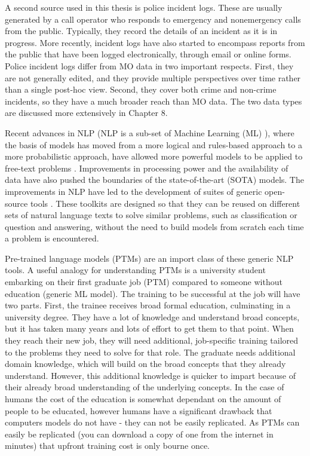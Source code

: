 A second source used in this thesis is police incident logs. These are usually generated by a call operator who responds to emergency and nonemergency calls from the public. Typically, they record the details of an incident as it is in progress. More recently, incident logs have also started to encompass reports from the public that have been logged electronically, through email or online forms. Police incident logs differ from MO data in two important respects. First, they are not generally edited, and they provide multiple perspectives over time rather than a single post-hoc view. Second, they cover both crime and non-crime incidents, so they have a much broader reach than MO data. The two data types are discussed more extensively in Chapter 8.

Recent advances in NLP (NLP is a sub-set of Machine Learning (ML) ), where the basis of models has moved from a more logical and rules-based approach to a more probabilistic approach, have allowed more powerful models to be applied to free-text problems \parencite{kumar2011natural}. Improvements in processing power and the availability of data have also pushed the boundaries of the state-of-the-art (SOTA) models. The improvements in NLP have led to the development of suites of generic open-source tools \parencite{manning2014stanford, benoit2018quanteda, loper2002nltk}. These toolkits are designed so that they can be reused on different sets of natural language texts to solve similar problems, such as classification or question and answering, without the need to build models from scratch each time a problem is encountered.

Pre-trained language models (PTMs) are an import class of these generic NLP tools. A useful analogy for understanding PTMs is a university student embarking on their first graduate job (PTM) compared to someone without education (generic ML model). The training to be successful at the job will have two parts. First, the trainee receives broad formal education,  culminating in a university degree. They have a lot of knowledge and understand broad concepts, but it has taken many years and lots of effort to get them to that point. When they reach their new job, they will need additional, job-specific training tailored to the problems they need to solve for that role. The graduate needs additional domain knowledge, which will build on the broad concepts that they already understand. However, this additional knowledge is quicker to impart because of their already broad understanding of the underlying concepts. In the case of humans the cost of the education is somewhat dependant on the amount of people to be educated, however humans have a significant drawback that computers models do not have - they can not be easily replicated. As PTMs can easily be replicated (you can download a copy of one from the internet in minutes) that upfront training cost is only bourne once.

